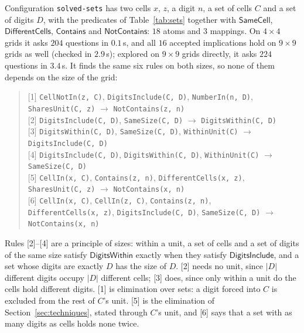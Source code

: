 \documentclass[11pt,a4paper]{article}
\theoremstyle{definition}
\theoremstyle{remark}
\newcommand{\code}[1]{\texttt{#1}}
\newcommand{\pred}[1]{\mathsf{#1}}
\newcommand{\Contains}{\pred{Contains}}
\newcommand{\NotContains}{\pred{NotContains}}
\begin{document}
Configuration \code{solved-sets} has two cells $x$, $z$, a digit $n$, a set of cells $C$ and a set of digits $D$, with the predicates of Table~\ref{tab:sets} together with $\pred{SameCell}$, $\pred{DifferentCells}$, $\Contains$ and $\NotContains$: $18$ atoms and $3$ mappings. On $4 \times 4$ grids it asks $204$ questions in $0.1$\,s, and all $16$ accepted implications hold on $9 \times 9$ grids as well (checked in $2.9$\,s); explored on $9 \times 9$ grids directly, it asks $224$ questions in $3.4$\,s. It finds the same six rules on both sizes, so none of them depends on the size of the grid:
\begin{quote}\small\raggedright
[1] \texttt{CellNotIn(z,~C)}, \allowbreak \texttt{DigitsInclude(C,~D)}, \allowbreak \texttt{NumberIn(n,~D)}, \allowbreak \texttt{SharesUnit(C,~z)} \;$\to$\; \texttt{NotContains(z,~n)}\\
{}[2] \texttt{DigitsInclude(C,~D)}, \allowbreak \texttt{SameSize(C,~D)} \;$\to$\; \texttt{DigitsWithin(C,~D)}\\
{}[3] \texttt{DigitsWithin(C,~D)}, \allowbreak \texttt{SameSize(C,~D)}, \allowbreak \texttt{WithinUnit(C)} \;$\to$\; \texttt{DigitsInclude(C,~D)}\\
{}[4] \texttt{DigitsInclude(C,~D)}, \allowbreak \texttt{DigitsWithin(C,~D)}, \allowbreak \texttt{WithinUnit(C)} \;$\to$\; \texttt{SameSize(C,~D)}\\
{}[5] \texttt{CellIn(x,~C)}, \allowbreak \texttt{Contains(z,~n)}, \allowbreak \texttt{DifferentCells(x,~z)}, \allowbreak \texttt{SharesUnit(C,~z)} \;$\to$\; \texttt{NotContains(x,~n)}\\
{}[6] \texttt{CellIn(x,~C)}, \allowbreak \texttt{CellIn(z,~C)}, \allowbreak \texttt{Contains(z,~n)}, \allowbreak \texttt{DifferentCells(x,~z)}, \allowbreak \texttt{DigitsInclude(C,~D)}, \allowbreak \texttt{SameSize(C,~D)} \;$\to$\; \texttt{NotContains(x,~n)}
\end{quote}
Rules [2]--[4] are a principle of sizes: within a unit, a set of cells and a set of digits of the same size satisfy $\pred{DigitsWithin}$ exactly when they satisfy $\pred{DigitsInclude}$, and a set whose digits are exactly $D$ has the size of $D$. [2] needs no unit, since $\lvert D\rvert$ different digits occupy $\lvert D\rvert$ different cells; [3] does, since only within a unit do the cells hold different digits. [1] is elimination over sets: a digit forced into $C$ is excluded from the rest of $C$'s unit. [5] is the elimination of Section~\ref{sec:techniques}, stated through $C$'s unit, and [6] says that a set with as many digits as cells holds none twice.
\end{document}
